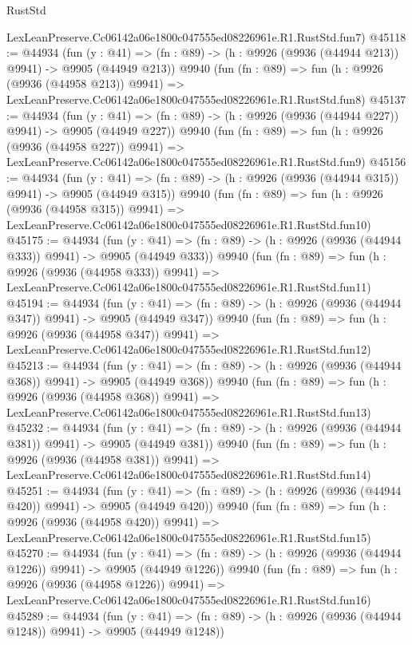 \begin{lexlean}{RustStd}
\begin{coremodule}
    LexLeanPreserve.Cc06142a06e1800c047555ed08226961e.R1.RustStd.fun7)
@45118 := @44934
    (fun (y : @41) => (fn : @89) -> (h : @9926 (@9936 (@44944 @213)) @9941) -> @9905 (@44949 @213))
    @9940
    (fun (fn : @89) =>
    fun (h : @9926 (@9936 (@44958 @213)) @9941) =>
    LexLeanPreserve.Cc06142a06e1800c047555ed08226961e.R1.RustStd.fun8)
@45137 := @44934
    (fun (y : @41) => (fn : @89) -> (h : @9926 (@9936 (@44944 @227)) @9941) -> @9905 (@44949 @227))
    @9940
    (fun (fn : @89) =>
    fun (h : @9926 (@9936 (@44958 @227)) @9941) =>
    LexLeanPreserve.Cc06142a06e1800c047555ed08226961e.R1.RustStd.fun9)
@45156 := @44934
    (fun (y : @41) => (fn : @89) -> (h : @9926 (@9936 (@44944 @315)) @9941) -> @9905 (@44949 @315))
    @9940
    (fun (fn : @89) =>
    fun (h : @9926 (@9936 (@44958 @315)) @9941) =>
    LexLeanPreserve.Cc06142a06e1800c047555ed08226961e.R1.RustStd.fun10)
@45175 := @44934
    (fun (y : @41) => (fn : @89) -> (h : @9926 (@9936 (@44944 @333)) @9941) -> @9905 (@44949 @333))
    @9940
    (fun (fn : @89) =>
    fun (h : @9926 (@9936 (@44958 @333)) @9941) =>
    LexLeanPreserve.Cc06142a06e1800c047555ed08226961e.R1.RustStd.fun11)
@45194 := @44934
    (fun (y : @41) => (fn : @89) -> (h : @9926 (@9936 (@44944 @347)) @9941) -> @9905 (@44949 @347))
    @9940
    (fun (fn : @89) =>
    fun (h : @9926 (@9936 (@44958 @347)) @9941) =>
    LexLeanPreserve.Cc06142a06e1800c047555ed08226961e.R1.RustStd.fun12)
@45213 := @44934
    (fun (y : @41) => (fn : @89) -> (h : @9926 (@9936 (@44944 @368)) @9941) -> @9905 (@44949 @368))
    @9940
    (fun (fn : @89) =>
    fun (h : @9926 (@9936 (@44958 @368)) @9941) =>
    LexLeanPreserve.Cc06142a06e1800c047555ed08226961e.R1.RustStd.fun13)
@45232 := @44934
    (fun (y : @41) => (fn : @89) -> (h : @9926 (@9936 (@44944 @381)) @9941) -> @9905 (@44949 @381))
    @9940
    (fun (fn : @89) =>
    fun (h : @9926 (@9936 (@44958 @381)) @9941) =>
    LexLeanPreserve.Cc06142a06e1800c047555ed08226961e.R1.RustStd.fun14)
@45251 := @44934
    (fun (y : @41) => (fn : @89) -> (h : @9926 (@9936 (@44944 @420)) @9941) -> @9905 (@44949 @420))
    @9940
    (fun (fn : @89) =>
    fun (h : @9926 (@9936 (@44958 @420)) @9941) =>
    LexLeanPreserve.Cc06142a06e1800c047555ed08226961e.R1.RustStd.fun15)
@45270 := @44934
    (fun (y : @41) =>
    (fn : @89) -> (h : @9926 (@9936 (@44944 @1226)) @9941) -> @9905 (@44949 @1226))
    @9940
    (fun (fn : @89) =>
    fun (h : @9926 (@9936 (@44958 @1226)) @9941) =>
    LexLeanPreserve.Cc06142a06e1800c047555ed08226961e.R1.RustStd.fun16)
@45289 := @44934
    (fun (y : @41) =>
    (fn : @89) -> (h : @9926 (@9936 (@44944 @1248)) @9941) -> @9905 (@44949 @1248))

\end{coremodule}
\end{lexlean}
